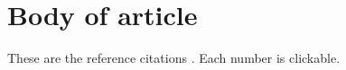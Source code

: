 \documentclass[11pt]{article}
\begin{document}
\section{Body of article}
These are the reference citations \cite{Dirheimer94, Cruz09, RivasEddy17,Dirheimer94, Cruz09, RivasEddy17, VicensKieft22, Brown09, Gutell14, Smith10, Washietl05, Nawrocki09, Wheeler13b, Gao21, Rfam24, Rivas20b, Nawrocki13c, Wheeler13, RepearMasker, Rivas20, Henikoff92, Gao22, Sayers23, Camargo22, Magnus22, Steckelberg18, Das23, ZhangPyle22, Fitch1971}.
Each number is clickable.

\end{document}

